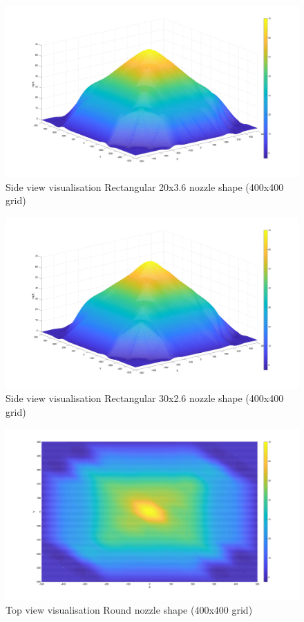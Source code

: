\begin{figure}
    \centering
    \includegraphics[width=0.75\linewidth]{Images/Rec20_side_400.jpg}
    \caption{Side view visualisation Rectangular 20x3.6 nozzle shape (400x400 grid)}
\end{figure}

\begin{figure}
    \centering
    \includegraphics[width=0.75\linewidth]{Images/Rec30_side_400.jpg}
    \caption{Side view visualisation Rectangular 30x2.6 nozzle shape (400x400 grid)}
\end{figure}

\begin{figure}
    \centering
    \includegraphics[width=0.75\linewidth]{Images/Round_top_400.jpg}
    \caption{Top view visualisation Round nozzle shape (400x400 grid)}
\end{figure}

